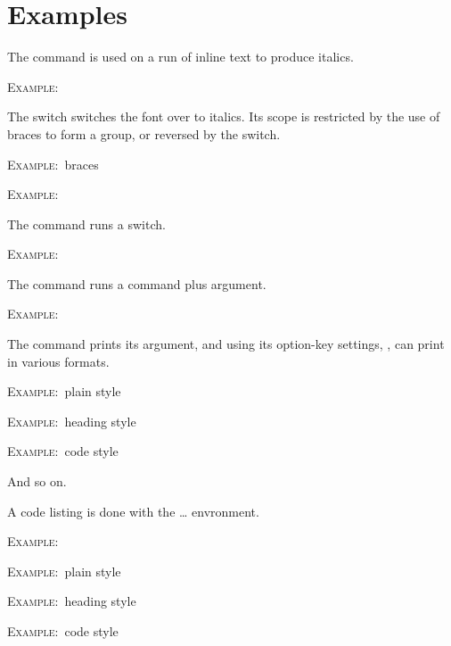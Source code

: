 \documentclass{article}
\newcommand{\ee}{\par\textsc{Example:~}}
\begin{document}
\section{Examples}
The \cs{\textit}\margvcss{} command is used on a run of inline text to produce italics.
\ee
{}

The \cs{\itshape} switch switches the font over to italics. Its scope is restricted by the use of braces to form a group, or reversed by the \cs{\upshape} switch.
\ee braces
\ee {}

The \cs{\cc}\margvcss{} command runs a switch.
\ee
{}

The \cs{\cd}\margvcss{} command runs a command plus argument.
\ee
{}

The \cs{\cdrd}\margvcss{} command prints its argument, and using its option-key settings, \cs{\cdrd}\margvcss{}, can print in various formats.
\ee plain style
\ee heading style
\cdrq{\cdrd[format=head]{\textit}}
\ee code style

And so on.

A code listing is done with the \cdrd[format=detok]{\begin{latexcode}} \ldots \cdrd[format=detok]{\end{latexcode}} envronment.
\ee
\begin{latexcode}

\ee plain style
\ee heading style
\cdrq{\cdrd[format=head]{\textit}}
\ee code style

\end{latexcode}
\end{document}
